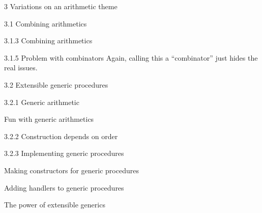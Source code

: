 \documentclass[12pt]{PalisadesLakesBook}
\begin{document}
\begin{plSection}{3 Variations on an arithmetic theme}
\begin{plSection}{3.1 Combining arithmetics}
\begin{plSection}{3.1.3 Combining arithmetics}
\begin{plSection}{3.1.5 Problem with combinators}
Again, calling this a ``combinator'' just hides the real issues.

\end{plSection}%
\end{plSection}%
\begin{plSection}{3.2 Extensible generic procedures}
\begin{plSection}{3.2.1 Generic arithmetic}
\begin{plSection}{Fun with generic arithmetics}
\end{plSection}%
\end{plSection}%
\begin{plSection}{3.2.2 Construction depends on order}
\end{plSection}%
\begin{plSection}{3.2.3 Implementing generic procedures}
\begin{plSection}{Making constructors for generic procedures}
\end{plSection}%
\begin{plSection}{Adding handlers to generic procedures}
\end{plSection}%
\begin{plSection}{The power of extensible generics}
\end{plSection}%
\end{plSection}%
\end{plSection}%

\end{plSection}
\end{plSection}
\end{document}
